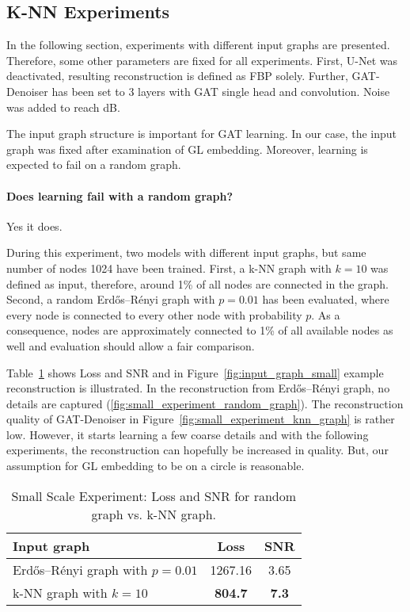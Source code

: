 \subsection{K-NN Experiments}
  In the following section, experiments with different input graphs are presented.
  Therefore, some other parameters are fixed for all experiments.
  First, U-Net was deactivated, resulting reconstruction is defined as FBP solely.
  Further, GAT-Denoiser has been set to 3 layers with GAT single head and convolution. 
  Noise was added to reach  dB.

  The input graph structure is important for GAT learning.
  In our case, the input graph was fixed after examination of GL embedding.
  Moreover, learning is expected to fail on a random graph.

  \paragraph{Does learning fail with a random graph?}
  Yes it does.

  During this experiment, two models with different input graphs, but same number of nodes 1024 have been trained.
  First, a k-NN graph with $k=10$ was defined as input, therefore, around 1\% of all nodes are connected in the graph.
  Second, a random Erdős–Rényi graph with $p=0.01$ has been evaluated, where every node is 
  connected to every other node with probability $p$. 
  As a consequence, nodes are approximately connected to 1\% of all available nodes as well and 
  evaluation should allow a fair comparison.
  
  Table~\ref{tab:input_graph} shows Loss and SNR and in Figure~\ref{fig:input_graph_small} example reconstruction is illustrated.
  In the reconstruction from Erdős–Rényi graph, no details are captured (\ref{fig:small_experiment_random_graph}). 
  The reconstruction quality of GAT-Denoiser in Figure~\ref{fig:small_experiment_knn_graph} is rather low. 
  However, it starts learning a few coarse details and with the following experiments, the reconstruction can hopefully be 
  increased in quality. But, our assumption for GL embedding to be on a circle is reasonable.

  \begin{table}[H]
    \centering
      \begin{tabular}{l|cc}
      \toprule
      \small  \textbf{Input graph} & \small \textbf{Loss} & \small \textbf{SNR}  \\ 
      \midrule
      Erdős–Rényi graph with $p=0.01$    &  1267.16         &  3.65   \\ \hline
      k-NN graph with $k=10$             &  \textbf{804.7}           &  \textbf{7.3 }   \\ \hline
      \midrule
      \end{tabular}
    \caption{Small Scale Experiment: Loss and SNR for random graph vs. k-NN graph. }
    \label{tab:input_graph}
  \end{table}

